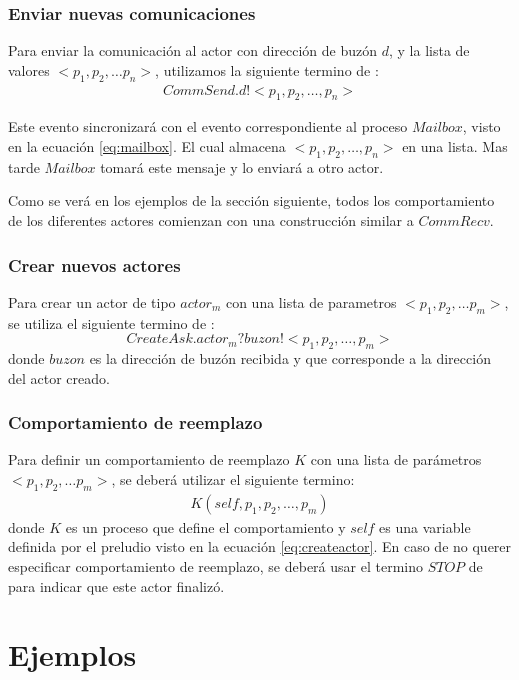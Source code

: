 \subsubsection*{Enviar nuevas comunicaciones}
 Para enviar la comunicación al actor con dirección de buzón $d$, y la lista de valores $<p_1, p_2, \ldots p_n>$, utilizamos la siguiente termino de \CSP:
\begin{align*}
CommSend.d!<p_1, p_2, \ldots, p_n> 
\end{align*}

Este evento sincronizará con el evento correspondiente al proceso $Mailbox$, visto en la ecuación \ref{eq:mailbox}. El cual almacena $<p_1, p_2, \ldots, p_n>$ en una lista. Mas tarde $Mailbox$ tomará este mensaje y lo enviará a otro actor. 

Como se verá en los ejemplos de la sección siguiente, todos los comportamiento de los diferentes actores comienzan con una construcción similar a $CommRecv$.

\subsubsection*{Crear nuevos actores}
Para crear un actor de tipo $actor_m$  con una lista de parametros $<p_1, p_2, \ldots p_m>$, se utiliza el siguiente termino de \CSP: 
\begin{equation*}
CreateAsk.actor_m?buzon!<p_1, p_2, \ldots, p_m> 
\end{equation*}	
donde $buzon$ es la dirección de buzón recibida y que corresponde a la dirección del actor creado.

\subsubsection*{Comportamiento de reemplazo}
Para definir un comportamiento de reemplazo $K$ con una lista de parámetros $<p_1, p_2, \ldots p_m>$, se deberá utilizar el siguiente termino: 
\begin{align*}
K(self, p_1, p_2, \ldots, p_m) 
\end{align*}	
donde $K$ es un proceso \CSP que define el comportamiento y $self$ es una variable definida por el preludio visto en la ecuación \ref{eq:createactor}.
En caso de no querer especificar comportamiento de reemplazo, se deberá usar el termino $STOP$ de \CSP para indicar que este actor finalizó.
\section{Ejemplos}

